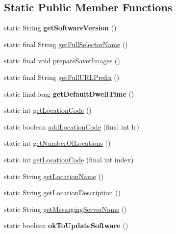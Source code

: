 \subsection*{Static Public Member Functions}
\begin{DoxyCompactItemize}
\item 
\hypertarget{classgov_1_1fnal_1_1ppd_1_1dd_1_1GlobalVariables_a7ad73efb183068d334b1977c3ef799cc}{static String {\bfseries get\-Software\-Version} ()}\label{classgov_1_1fnal_1_1ppd_1_1dd_1_1GlobalVariables_a7ad73efb183068d334b1977c3ef799cc}

\item 
static final String \hyperlink{classgov_1_1fnal_1_1ppd_1_1dd_1_1GlobalVariables_ae88e0336fe6e23f56d14aee1882b88d4}{get\-Full\-Selector\-Name} ()
\item 
static final void \hyperlink{classgov_1_1fnal_1_1ppd_1_1dd_1_1GlobalVariables_ad98b765500d19827fff9a6aa78b8b9a4}{prepare\-Saver\-Images} ()
\item 
static final String \hyperlink{classgov_1_1fnal_1_1ppd_1_1dd_1_1GlobalVariables_ab7639ebfcc296b374593079a06026c65}{get\-Full\-U\-R\-L\-Prefix} ()
\item 
\hypertarget{classgov_1_1fnal_1_1ppd_1_1dd_1_1GlobalVariables_aedef0ba63ced272b0ec2f17504a2cf96}{static final long {\bfseries get\-Default\-Dwell\-Time} ()}\label{classgov_1_1fnal_1_1ppd_1_1dd_1_1GlobalVariables_aedef0ba63ced272b0ec2f17504a2cf96}

\item 
static int \hyperlink{classgov_1_1fnal_1_1ppd_1_1dd_1_1GlobalVariables_a9628de1e1de48d98cda0cc110f0c1b92}{get\-Location\-Code} ()
\item 
static boolean \hyperlink{classgov_1_1fnal_1_1ppd_1_1dd_1_1GlobalVariables_a17d26da1f2cffe32553babb71545319e}{add\-Location\-Code} (final int lc)
\item 
static int \hyperlink{classgov_1_1fnal_1_1ppd_1_1dd_1_1GlobalVariables_af9305013fcd1f485a77e6448b5b14ebb}{get\-Number\-Of\-Locations} ()
\item 
static int \hyperlink{classgov_1_1fnal_1_1ppd_1_1dd_1_1GlobalVariables_afa655a7918baebe5606c9a936f25a2b5}{get\-Location\-Code} (final int index)
\item 
static String \hyperlink{classgov_1_1fnal_1_1ppd_1_1dd_1_1GlobalVariables_a2b6eb3cd0162c4ef8a7476afc3180602}{get\-Location\-Name} ()
\item 
static String \hyperlink{classgov_1_1fnal_1_1ppd_1_1dd_1_1GlobalVariables_a0dd398dcbd954f1d5c9060a40567cde8}{get\-Location\-Description} ()
\item 
static String \hyperlink{classgov_1_1fnal_1_1ppd_1_1dd_1_1GlobalVariables_a031a776923237b72e7cfa1e2804097ad}{get\-Messaging\-Server\-Name} ()
\item 
\hypertarget{classgov_1_1fnal_1_1ppd_1_1dd_1_1GlobalVariables_a3d2db19203c4e972d23055ac6ca6d728}{static boolean {\bfseries ok\-To\-Update\-Software} ()}\label{classgov_1_1fnal_1_1ppd_1_1dd_1_1GlobalVariables_a3d2db19203c4e972d23055ac6ca6d728}


\end{DoxyCompactItemize}
